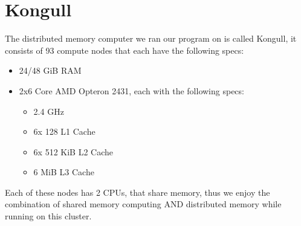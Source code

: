 \section{Kongull}

The distributed memory computer we ran our program on is called Kongull, it consists of 93 compute nodes that each have the following specs:
\begin{itemize}
    \item 24/48 GiB RAM
    \item 2x6 Core AMD Opteron 2431, each with the following specs:
    \begin{itemize}
        \item 2.4 GHz
        \item 6x 128 L1 Cache
        \item 6x 512 KiB L2 Cache
        \item 6 MiB L3 Cache
    \end{itemize}
\end{itemize}

Each of these nodes has 2 CPUs, that share memory, thus we enjoy the combination of shared memory computing AND distributed memory while
running on this cluster.